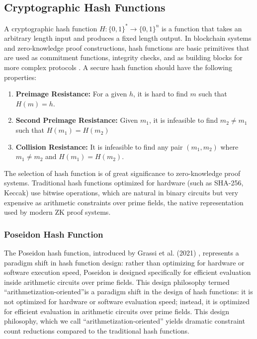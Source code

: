 \documentclass[12pt, a4paper]{report}
\begin{document}
\subsection{Cryptographic Hash Functions}

A cryptographic hash function $H: \{0,1\}^* \rightarrow \{0,1\}^n$ is a function that takes an arbitrary length input and produces a fixed length output. In blockchain systems and zero-knowledge proof constructions, hash functions are basic primitives that are used as commitment functions, integrity checks, and as building blocks for more complex protocols \cite{merkle1988digital}. A secure hash function should have the following properties:

\begin{enumerate}
    \item \textbf{Preimage Resistance:} For a given $h$, it is hard to find $m$ such that $H(m) = h$. 
    
    \item \textbf{Second Preimage Resistance:} Given $m_1$, it is infeasible to find $m_2 \neq m_1$ such that $H(m_1) = H(m_2)$
    
    \item \textbf{Collision Resistance:} It is infeasible to find any pair $(m_1, m_2)$ where $m_1 \neq m_2$ and $H(m_1) = H(m_2)$.
\end{enumerate}

The selection of hash function is of great significance to zero-knowledge proof systems. Traditional hash functions optimized for hardware (such as SHA-256, Keccak) use bitwise operations, which are natural in binary circuits but very expensive as arithmetic constraints over prime fields, the native representation used by modern ZK proof systems.

\subsubsection{Poseidon Hash Function}

The Poseidon hash function, introduced by Grassi et al. (2021) \cite{grassi2021poseidon}, represents a paradigm shift in hash function design: rather than optimizing for hardware or software execution speed, Poseidon is designed specifically for efficient evaluation inside arithmetic circuits over prime fields. This design philosophy termed ``arithmetization-oriented''is a paradigm shift in the design of hash functions: it is not optimized for hardware or software evaluation speed; instead, it is optimized for efficient evaluation in arithmetic circuits over prime fields. This design philosophy, which we call “arithmetization-oriented” yields dramatic constraint count reductions compared to the traditional hash functions.
\end{document}

